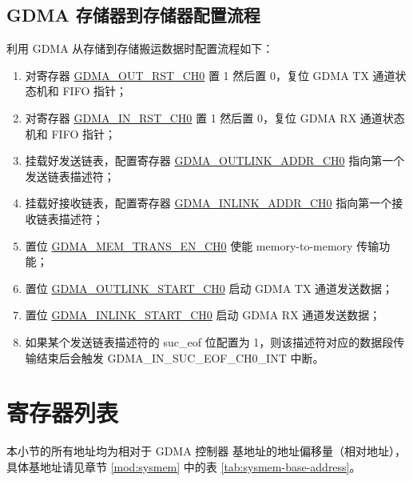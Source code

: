 \documentclass[main\_\_CN.tex]{subfiles}
\begin{document}
\subsection{GDMA 存储器到存储器配置流程}\label{tx-rx-program}
利用 GDMA 从存储到存储搬运数据时配置流程如下：
\begin{enumerate}
    \item 对寄存器 \hyperref[fielddesc:GDMAOUTRSTCH0]{GDMA\_OUT\_RST\_CH0} 置 1 然后置 0，复位 GDMA TX 通道状态机和 FIFO 指针；
    \item 对寄存器 \hyperref[fielddesc:GDMAINRSTCH0]{GDMA\_IN\_RST\_CH0} 置 1 然后置 0，复位 GDMA RX 通道状态机和 FIFO 指针；
    \item 挂载好发送链表，配置寄存器 \hyperref[fielddesc:GDMAOUTLINKADDRCH0]{GDMA\_OUTLINK\_ADDR\_CH0} 指向第一个发送链表描述符；
    \item 挂载好接收链表，配置寄存器 \hyperref[fielddesc:GDMAINLINKADDRCH0]{GDMA\_INLINK\_ADDR\_CH0} 指向第一个接收链表描述符；
    \item 置位 \hyperref[fielddesc:GDMAMEMTRANSENCH0]{GDMA\_MEM\_TRANS\_EN\_CH0} 使能 memory-to-memory 传输功能；
    \item 置位 \hyperref[fielddesc:GDMAOUTLINKSTARTCH0]{GDMA\_OUTLINK\_START\_CH0} 启动 GDMA TX 通道发送数据；
    \item 置位 \hyperref[fielddesc:GDMAINLINKSTARTCH0]{GDMA\_INLINK\_START\_CH0} 启动 GDMA RX 通道发送数据；
    \item 如果某个发送链表描述符的 suc\_eof 位配置为 1，则该描述符对应的数据段传输结束后会触发 GDMA\_IN\_SUC\_EOF\_CH0\_INT 中断。
\end{enumerate}





\clearpage
\hypertarget{dma-reg-summ}{}
\section{寄存器列表}
\label{sec:dma-reg-summ}

本小节的所有地址均为相对于 GDMA 控制器 基地址的地址偏移量（相对地址），具体基地址请见章节 \ref{mod:sysmem} \textit{} 中的表 \ref{tab:sysmem-base-address}。
\end{document}
